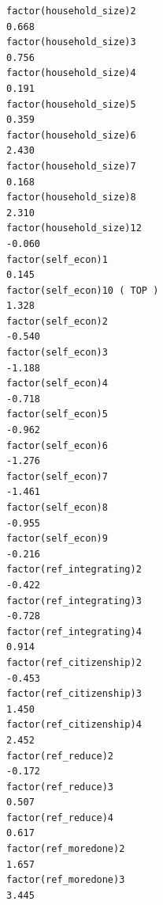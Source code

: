 \documentclass[
]{article}
\begin{document}
\begin{table}
\begin{minipage}[t]{\linewidth}
{\begin{verbatim}
factor(household_size)2                                                             0.668
factor(household_size)3                                                             0.756
factor(household_size)4                                                             0.191
factor(household_size)5                                                             0.359
factor(household_size)6                                                             2.430
factor(household_size)7                                                             0.168
factor(household_size)8                                                             2.310
factor(household_size)12                                                           -0.060
factor(self_econ)1                                                                  0.145
factor(self_econ)10 ( TOP )                                                         1.328
factor(self_econ)2                                                                 -0.540
factor(self_econ)3                                                                 -1.188
factor(self_econ)4                                                                 -0.718
factor(self_econ)5                                                                 -0.962
factor(self_econ)6                                                                 -1.276
factor(self_econ)7                                                                 -1.461
factor(self_econ)8                                                                 -0.955
factor(self_econ)9                                                                 -0.216
factor(ref_integrating)2                                                           -0.422
factor(ref_integrating)3                                                           -0.728
factor(ref_integrating)4                                                            0.914
factor(ref_citizenship)2                                                           -0.453
factor(ref_citizenship)3                                                            1.450
factor(ref_citizenship)4                                                            2.452
factor(ref_reduce)2                                                                -0.172
factor(ref_reduce)3                                                                 0.507
factor(ref_reduce)4                                                                 0.617
factor(ref_moredone)2                                                               1.657
factor(ref_moredone)3                                                               3.445

\end{verbatim}}
\end{minipage}
\end{table}
\end{document}
